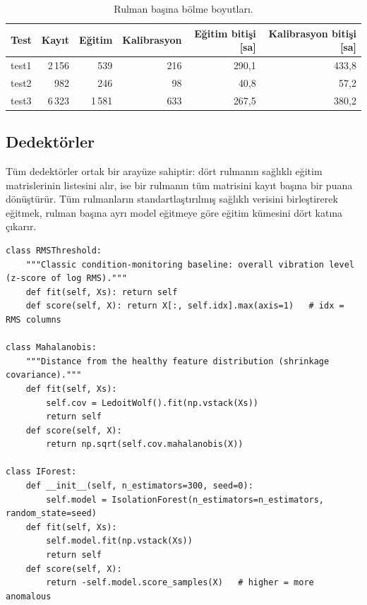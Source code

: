 \documentclass[11pt]{article}
\begin{document}
\begin{table}[H]
\centering
\caption{Rulman başına bölme boyutları.}
\label{tab:splits}
\begin{tabular}{lrrrrr}
\toprule
Test & Kayıt & Eğitim & Kalibrasyon & Eğitim bitişi [sa] & Kalibrasyon bitişi [sa] \\
\midrule
test1 & 2\,156 & 539   & 216 & 290,1 & 433,8 \\
test2 & 982    & 246   & 98  & 40,8  & 57,2 \\
test3 & 6\,323 & 1\,581 & 633 & 267,5 & 380,2 \\
\bottomrule
\end{tabular}
\end{table}

\subsection{Dedektörler}
Tüm dedektörler ortak bir arayüze sahiptir:  dört rulmanın sağlıklı eğitim matrislerinin
listesini alır,  ise bir rulmanın tüm matrisini kayıt başına bir puana dönüştürür. Tüm
rulmanların standartlaştırılmış sağlıklı verisini birleştirerek eğitmek, rulman başına ayrı model
eğitmeye göre eğitim kümesini dört katına çıkarır.

\begin{lstlisting}[caption={Klasik dedektörler (\code{src/bearing\_efw/models.py}'den alıntı).},label=lst:models]
class RMSThreshold:
    """Classic condition-monitoring baseline: overall vibration level (z-score of log RMS)."""
    def fit(self, Xs): return self
    def score(self, X): return X[:, self.idx].max(axis=1)   # idx = RMS columns

class Mahalanobis:
    """Distance from the healthy feature distribution (shrinkage covariance)."""
    def fit(self, Xs):
        self.cov = LedoitWolf().fit(np.vstack(Xs))
        return self
    def score(self, X):
        return np.sqrt(self.cov.mahalanobis(X))

class IForest:
    def __init__(self, n_estimators=300, seed=0):
        self.model = IsolationForest(n_estimators=n_estimators, random_state=seed)
    def fit(self, Xs):
        self.model.fit(np.vstack(Xs))
        return self
    def score(self, X):
        return -self.model.score_samples(X)   # higher = more anomalous
\end{lstlisting}
\end{document}
